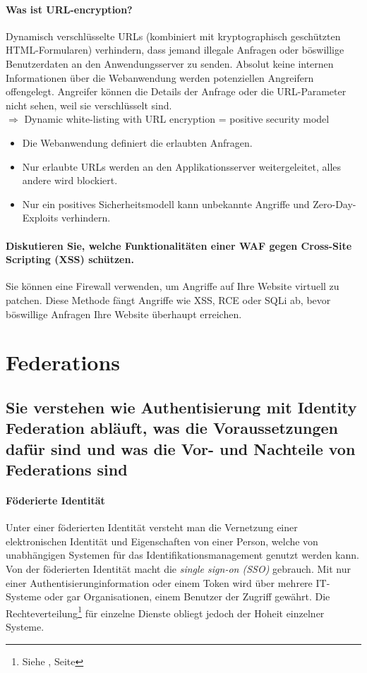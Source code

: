 \documentclass[10pt,a4paper]{article}
\begin{document}
\paragraph*{Was ist URL-encryption?}Dynamisch verschlüsselte URLs (kombiniert mit kryptographisch geschützten HTML-Formularen) verhindern, dass jemand
illegale Anfragen oder böswillige Benutzerdaten an den Anwendungsserver zu senden. Absolut keine internen Informationen über die Webanwendung werden potenziellen Angreifern offengelegt. Angreifer können die
Details der Anfrage oder die URL-Parameter nicht sehen, weil sie verschlüsselt sind.
\\
$\Rightarrow$ Dynamic white-listing with URL encryption = positive security model
\begin{itemize}[noitemsep,topsep=0pt,leftmargin=*]
    \item Die Webanwendung definiert die erlaubten Anfragen.
    \item Nur erlaubte URLs werden an den Applikationsserver weitergeleitet, alles andere wird blockiert.
    \item Nur ein positives Sicherheitsmodell kann unbekannte Angriffe und Zero-Day-Exploits verhindern.
\end{itemize}

\paragraph*{Diskutieren Sie, welche Funktionalitäten einer WAF gegen Cross-Site Scripting (XSS) schützen.} Sie können eine Firewall verwenden, um Angriffe auf Ihre Website virtuell zu patchen. Diese Methode fängt Angriffe wie XSS, RCE oder SQLi ab, bevor böswillige Anfragen Ihre Website überhaupt erreichen.

\pagebreak
\section{Federations}
\subsection*{Sie verstehen wie Authentisierung mit Identity Federation abläuft, was die Voraussetzungen dafür sind und was die Vor- und Nachteile von Federations sind}
\paragraph*{Föderierte Identität}Unter einer föderierten Identität versteht man die Vernetzung einer elektronischen Identität und Eigenschaften von einer Person, welche von unabhängigen Systemen für das Identifikationsmanagement genutzt werden kann. Von der föderierten Identität macht die \textsl{single sign-on (SSO)} gebrauch. Mit nur einer Authentisierunginformation oder einem Token wird über mehrere IT-Systeme oder gar Organisationen, einem Benutzer der Zugriff gewährt. Die Rechteverteilung\footnote{{Siehe \underline{}, Seite \pageref{para:Autorisierung}}} für einzelne Dienste obliegt jedoch der Hoheit einzelner Systeme.
\end{document}
